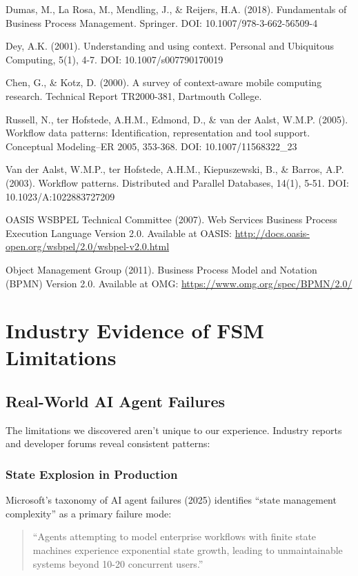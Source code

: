 \documentclass[11pt,a4paper]{article}
\begin{document}
Dumas, M., La Rosa, M., Mendling, J., \& Reijers, H.A. (2018). Fundamentals of Business Process Management. Springer. DOI: 10.1007/978-3-662-56509-4

Dey, A.K. (2001). Understanding and using context. Personal and Ubiquitous Computing, 5(1), 4-7. DOI: 10.1007/s007790170019

Chen, G., \& Kotz, D. (2000). A survey of context-aware mobile computing research. Technical Report TR2000-381, Dartmouth College.

Russell, N., ter Hofstede, A.H.M., Edmond, D., \& van der Aalst, W.M.P. (2005). Workflow data patterns: Identification, representation and tool support. Conceptual Modeling–ER 2005, 353-368. DOI: 10.1007/11568322\_23

Van der Aalst, W.M.P., ter Hofstede, A.H.M., Kiepuszewski, B., \& Barros, A.P. (2003). Workflow patterns. Distributed and Parallel Databases, 14(1), 5-51. DOI: 10.1023/A:1022883727209

OASIS WSBPEL Technical Committee (2007). Web Services Business Process Execution Language Version 2.0. Available at OASIS: \url{http://docs.oasis-open.org/wsbpel/2.0/wsbpel-v2.0.html}

Object Management Group (2011). Business Process Model and Notation (BPMN) Version 2.0. Available at OMG: \url{https://www.omg.org/spec/BPMN/2.0/}

\appendix

\section{Industry Evidence of FSM Limitations}

\subsection{Real-World AI Agent Failures}

The limitations we discovered aren't unique to our experience. Industry reports and developer forums reveal consistent patterns:

\subsubsection{State Explosion in Production}

Microsoft's taxonomy of AI agent failures (2025) identifies ``state management complexity'' as a primary failure mode:
\begin{quote}
``Agents attempting to model enterprise workflows with finite state machines experience exponential state growth, leading to unmaintainable systems beyond 10-20 concurrent users.''
\end{quote}
\end{document}

